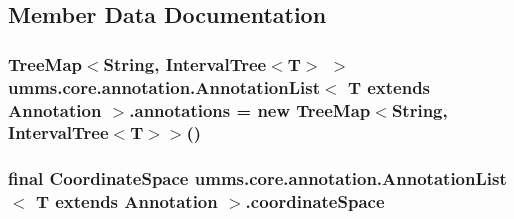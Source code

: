 \subsection{Member Data Documentation}
\hypertarget{classumms_1_1core_1_1annotation_1_1_annotation_list_3_01_t_01extends_01_annotation_01_4_a0822523251b80ee321b29730ecdc05d2}{
\subsubsection[{annotations}]{\setlength{\rightskip}{0pt plus 5cm}Tree\+Map$<$String, Interval\+Tree$<$T$>$ $>$ umms.\+core.\+annotation.\+Annotation\+List$<$ T extends {\bf Annotation} $>$.annotations = new Tree\+Map$<$String, Interval\+Tree$<$T$>$$>$()\hspace{0.3cm}{\ttfamily [protected]}}}\label{classumms_1_1core_1_1annotation_1_1_annotation_list_3_01_t_01extends_01_annotation_01_4_a0822523251b80ee321b29730ecdc05d2}
\hypertarget{classumms_1_1core_1_1annotation_1_1_annotation_list_3_01_t_01extends_01_annotation_01_4_aa4eb4081457dd28d136337f3447ad446}{
\subsubsection[{coordinate\+Space}]{\setlength{\rightskip}{0pt plus 5cm}final {\bf Coordinate\+Space} umms.\+core.\+annotation.\+Annotation\+List$<$ T extends {\bf Annotation} $>$.coordinate\+Space\hspace{0.3cm}{\ttfamily [protected]}}}\label{classumms_1_1core_1_1annotation_1_1_annotation_list_3_01_t_01extends_01_annotation_01_4_aa4eb4081457dd28d136337f3447ad446}
